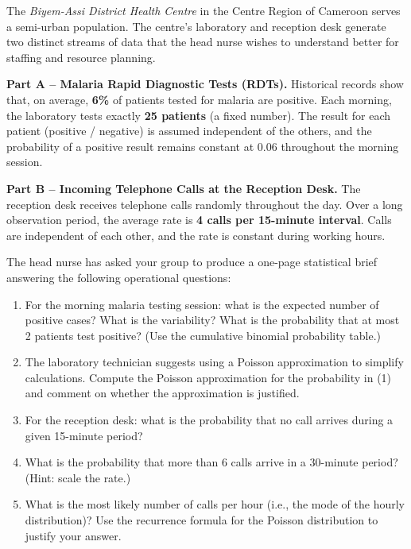 \documentclass[11pt]{article}
\begin{document}
\begin{experience}
The \emph{Biyem-Assi District Health Centre} in the Centre Region of Cameroon serves a semi-urban population. The centre's laboratory and reception desk generate two distinct streams of data that the head nurse wishes to understand better for staffing and resource planning.

\textbf{Part A -- Malaria Rapid Diagnostic Tests (RDTs).}  
Historical records show that, on average, \textbf{6\%} of patients tested for malaria are positive. Each morning, the laboratory tests exactly \textbf{25 patients} (a fixed number). The result for each patient (positive / negative) is assumed independent of the others, and the probability of a positive result remains constant at $0.06$ throughout the morning session.

\textbf{Part B -- Incoming Telephone Calls at the Reception Desk.}  
The reception desk receives telephone calls randomly throughout the day. Over a long observation period, the average rate is \textbf{4 calls per 15-minute interval}. Calls are independent of each other, and the rate is constant during working hours.

The head nurse has asked your group to produce a one-page statistical brief answering the following operational questions:
\begin{enumerate}
\item For the morning malaria testing session: what is the expected number of positive cases? What is the variability? What is the probability that at most 2 patients test positive? (Use the cumulative binomial probability table.)
\item The laboratory technician suggests using a Poisson approximation to simplify calculations. Compute the Poisson approximation for the probability in (1) and comment on whether the approximation is justified.
\item For the reception desk: what is the probability that no call arrives during a given 15-minute period?
\item What is the probability that more than 6 calls arrive in a 30-minute period? (Hint: scale the rate.)
\item What is the most likely number of calls per hour (i.e., the mode of the hourly distribution)? Use the recurrence formula for the Poisson distribution to justify your answer.
\end{enumerate}
\end{experience}
\end{document}

